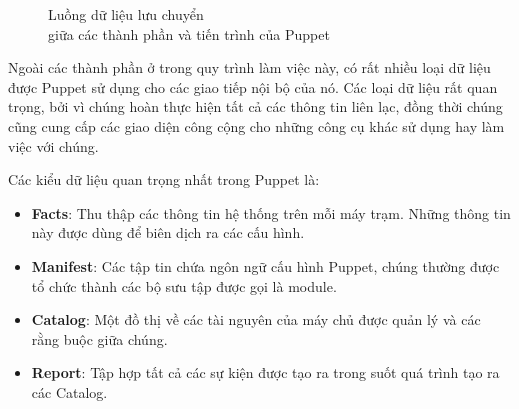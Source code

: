 \begin{figure}[h!]
    \begin{center}
    \end{center}
    \caption{Luồng dữ liệu lưu chuyển \\ giữa các thành phần và tiến trình của Puppet}
    \label{fig:puppet_timing_diagram}
\end{figure}

Ngoài các thành phần ở trong quy trình làm việc này, có rất nhiều loại dữ liệu được Puppet sử dụng cho các giao tiếp nội bộ của nó. Các loại dữ liệu rất quan trọng, bởi vì chúng hoàn thực hiện tất cả các thông tin liên lạc, đồng thời chúng cũng cung cấp các giao diện công cộng cho những công cụ khác sử dụng hay làm việc với chúng.

Các kiểu dữ liệu quan trọng nhất trong Puppet là:

\begin{itemize}
\item \textbf{Facts}: Thu thập các thông tin hệ thống trên mỗi máy trạm. Những thông tin này được dùng để biên dịch ra các cấu hình.

\item \textbf{Manifest}: Các tập tin chứa ngôn ngữ cấu hình Puppet, chúng thường được tổ chức thành các bộ sưu tập được gọi là module.

\item \textbf{Catalog}: Một đồ thị về các tài nguyên của máy chủ được quản lý và các rằng buộc giữa chúng.

\item \textbf{Report}: Tập hợp tất cả các sự kiện được tạo ra trong suốt quá trình tạo ra các Catalog.
\end{itemize}

